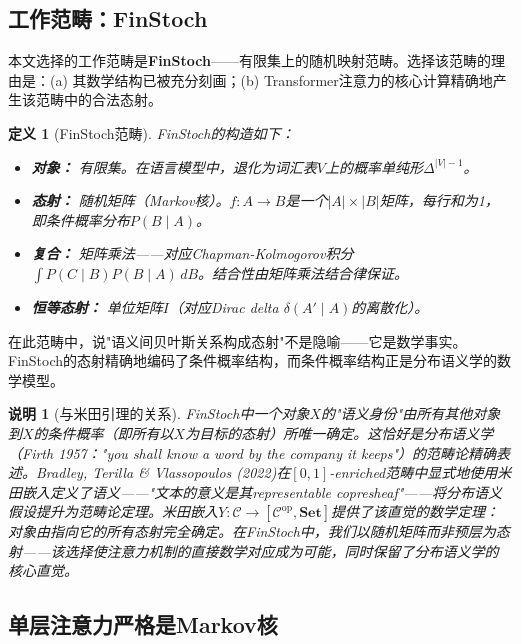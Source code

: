 \documentclass[11pt,a4paper]{ctexart}
\newtheorem{definition}[theorem]{定义}
\newtheorem{remark}[theorem]{说明}
\begin{document}
\subsection{工作范畴：FinStoch}

本文选择的工作范畴是\textbf{FinStoch}——有限集上的随机映射范畴。选择该范畴的理由是：(a) 其数学结构已被充分刻画\cite{Fritz2020Markov}；(b) Transformer注意力的核心计算精确地产生该范畴中的合法态射。

\begin{definition}[FinStoch范畴]
    FinStoch的构造如下：
    \begin{itemize}[leftmargin=*]
        \item \textbf{对象：} 有限集。在语言模型中，退化为词汇表$V$上的概率单纯形$\Delta^{|V|-1}$。
        \item \textbf{态射：} 随机矩阵（Markov核）。$f: A \to B$是一个$|A| \times |B|$矩阵，每行和为1，即条件概率分布$P(B \mid A)$。
        \item \textbf{复合：} 矩阵乘法——对应Chapman-Kolmogorov积分$\int P(C \mid B)P(B \mid A)\,dB$。结合性由矩阵乘法结合律保证。
        \item \textbf{恒等态射：} 单位矩阵$I$（对应Dirac delta $\delta(A' \mid A)$的离散化）。
    \end{itemize}
\end{definition}

在此范畴中，说"语义间贝叶斯关系构成态射"不是隐喻——它是数学事实。FinStoch的态射精确地编码了条件概率结构，而条件概率结构正是分布语义学的数学模型。

\begin{remark}[与米田引理的关系]
    FinStoch中一个对象$X$的"语义身份"由所有其他对象到$X$的条件概率（即所有以$X$为目标的态射）所唯一确定。这恰好是分布语义学（Firth 1957："you shall know a word by the company it keeps"）的范畴论精确表述。Bradley, Terilla \& Vlassopoulos (2022)\cite{Bradley2022Enriched}在$[0,1]$-enriched范畴中显式地使用米田嵌入定义了语义——"文本的意义是其representable copresheaf"——将分布语义假设提升为范畴论定理。米田嵌入$Y: \mathcal{C} \to [\mathcal{C}^{\mathrm{op}}, \mathbf{Set}]$提供了该直觉的数学定理：对象由指向它的所有态射完全确定。在FinStoch中，我们以随机矩阵而非预层为态射——该选择使注意力机制的直接数学对应成为可能，同时保留了分布语义学的核心直觉。
\end{remark}

\subsection{单层注意力严格是Markov核}
\end{document}
